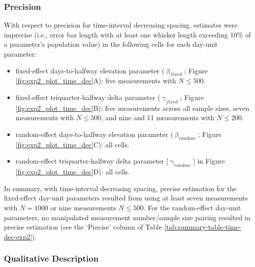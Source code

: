 \documentclass[
12pt, %
twoside,
english]{guelphthesis}
\begin{document}
\hypertarget{precision-time-dec-exp2}{%
\subsubsection{Precision}\label{precision-time-dec-exp2}}

With respect to precision for time-interval decreasing spacing, estimates were imprecise (i.e., error bar length with at least one whisker length exceeding 10\% of a parameter's population value) in the following cells for each day-unit parameter:
\begin{itemize}
\tightlist
\item
  fixed-effect days-to-halfway elevation parameter (\(\upbeta_{fixed}\); Figure \ref{fig:exp2_plot_time_dec}A): five measurements with \(N \le 500\).
\item
  fixed-effect triquarter-halfway delta parameter (\(\upgamma_{fixed}\); Figure \ref{fig:exp2_plot_time_dec}B): five measurements across all sample sizes, seven measurements with \(N \le 500\), and nine and 11 measurements with \(N \le 200\).
\item
  random-effect days-to-halfway elevation parameter (\(\upbeta_{random}\); Figure \ref{fig:exp2_plot_time_dec}C): all cells.
\item
  random-effect triquarter-halfway delta parameter {[}\(\upgamma_{random}\){]} in Figure \ref{fig:exp2_plot_time_dec}D): all cells.
\end{itemize}
In summary, with time-interval decreasing spacing, precise estimation for the fixed-effect day-unit parameters resulted from using at least seven measurements with \(N = 1000\) or nine measurements \(N \le 500\). For the random-effect day-unit parameters, no manipulated measurement number/sample size pairing resulted in precise estimation (see the `Precise' column of Table \ref{tab:summary-table-time-dec-exp2}).

\hypertarget{qualitative-time-dec-exp2}{%
\subsubsection{Qualitative Description}\label{qualitative-time-dec-exp2}}
\end{document}
